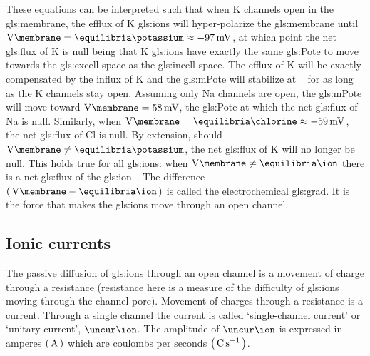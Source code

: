 \documentclass[class={.NoTouch/myProject}, crop=false]{standalone}
\begin{document}
These equations can be interpreted such that when
\gls{K} channels open in the \gls{gls:membrane}, the efflux of \gls{K} \glspl{gls:ion} will hyper-polarize the \gls{gls:membrane} until \(\unit{\V\membrane} = \unit{\equilibria\potassium} \approx \qty{-97}{\mV}\), at which point the net \gls{gls:flux} of \gls{K} is null being that \gls{K} \glspl{gls:ion} have exactly the same \gls{gls:Pote} to move towards the \gls{gls:excell} space as the \gls{gls:incell} space. 
The efflux of \gls{K} will be exactly compensated by the influx of \gls{K} and the \gls{gls:mPote} will stabilize at \unit{\equilibria\potassium} for as long as the \gls{K} channels stay open. 
Assuming only \gls{Na} channels are open, the \gls{gls:mPote} will move toward \(\unit{\V\membrane} = \qty{58}{\mV}\), the \gls{gls:Pote} at which the net \gls{gls:flux} of \gls{Na} is null. 
Similarly, when \(\unit{\V\membrane} = \unit{\equilibria\chlorine} \approx \qty{-59}{\mV}\),  
the net \gls{gls:flux} of \gls{Cl} is null. 
By extension, should \(\unit{\V\membrane} \neq \unit{\equilibria\potassium}\), the net \gls{gls:flux} of  \gls{K} will no longer be null. 
This holds true for all \glspl{gls:ion}: when \(\unit{\V\membrane} \neq \unit{\equilibria\ion}\) there is a net \gls{gls:flux} of the \gls{gls:ion}~\cite{}. The difference \(\br{\unit{\V\membrane} - \unit{\equilibria\ion}}\) is called the electrochemical \gls{gls:grad}. It is the force that makes the \glspl{gls:ion} move through an open channel.

\endgroup

\subsection{Ionic currents}
The passive diffusion of \glspl{gls:ion} through an open channel is a movement of charge through a resistance (resistance here is a measure of the difficulty of \glspl{gls:ion} moving through the channel pore). Movement of charges through a resistance is a current. Through a single channel the current is called `single-channel current' or `unitary current', \(\unit{\uncur\ion}\). The amplitude of  \(\unit{\uncur\ion}\) is expressed in amperes \(\br{\unit{\ampere}}\) which are coulombs per seconds \(\br{\unit{\coulomb\per\second}}\). 
\end{document}
